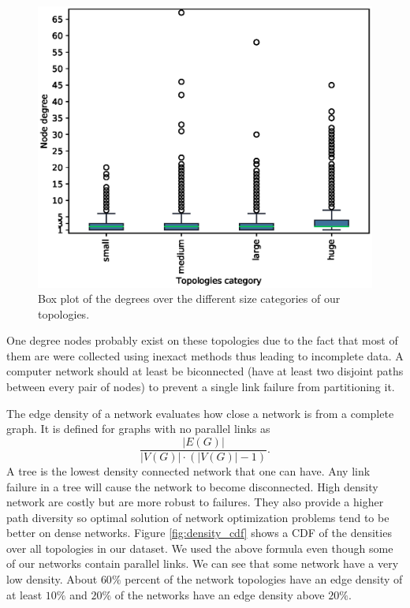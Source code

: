 \begin{figure}
\begin{center}
\includegraphics[width=.85\columnwidth]{./Network-lib/data/plot/deg_boxplot.eps}
\end{center}
\caption{Box plot of the degrees over the different size categories of our topologies.}
\label{fig:deg_boxplot}
\end{figure}

One degree nodes probably exist on these topologies due to the fact that most of them are were collected
using inexact methods thus leading to incomplete data. A computer network should at least be biconnected (have
at least two disjoint paths between every pair of nodes) to prevent a single link failure from partitioning
it.

The edge density of a network evaluates how close a network is from a complete graph. It is defined for graphs
with no parallel links as
$$
\frac{|E(G)|}{|V(G)| \cdot (|V(G)| - 1)}.
$$
A tree is the lowest density connected network that one can have. Any link failure in a tree will cause the network to become disconnected. High density network are costly but are more robust
to failures. They also provide a higher path diversity so optimal solution of network optimization problems tend to be
better on dense networks. Figure \ref{fig:density_cdf} shows a CDF of the densities over all topologies in
our dataset. We used the above formula even though some of our networks contain parallel links.
We can see that some network have a very low density. About $60\%$ percent of the network topologies
have an edge density of at least $10\%$ and $20\%$ of the networks have an edge density above $20\%$.


